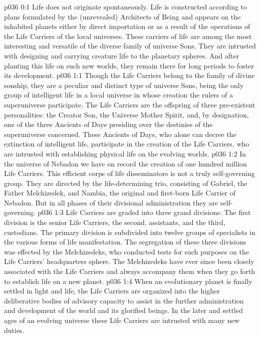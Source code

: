 \author{Vorondadek Son}
\vs p036 0:1 Life does not originate spontaneously. Life is constructed according to plans formulated by the (unrevealed) Architects of Being and appears on the inhabited planets either by direct importation or as a result of the operations of the Life Carriers of the local universes. These carriers of life are among the most interesting and versatile of the diverse family of universe Sons. They are intrusted with designing and carrying creature life to the planetary spheres. And after planting this life on such new worlds, they remain there for long periods to foster its development.\plusone
{}
\vs p036 1:1 Though the Life Carriers belong to the family of divine sonship, they are a peculiar and distinct type of universe Sons, being the only group of intelligent life in a local universe in whose creation the rulers of a superuniverse participate. The Life Carriers are the offspring of three pre\hyp{}existent personalities: the Creator Son, the Universe Mother Spirit, and, by designation, one of the three Ancients of Days presiding over the destinies of the superuniverse concerned. These Ancients of Days, who alone can decree the extinction of intelligent life, participate in the creation of the Life Carriers, who are intrusted with establishing physical life on the evolving worlds.
\vs p036 1:2 In the universe of Nebadon we have on record the creation of one hundred million Life Carriers. This efficient corps of life disseminators is not a truly self\hyp{}governing group. They are directed by the life\hyp{}determining trio, consisting of Gabriel, the Father Melchizedek, and Nambia, the original and first\hyp{}born Life Carrier of Nebadon. But in all phases of their divisional administration they are self\hyp{}governing.\plusone
\vs p036 1:3 Life Carriers are graded into three grand divisions: The first division is the senior Life Carriers, the second, assistants, and the third, custodians. The primary division is subdivided into twelve groups of specialists in the various forms of life manifestation. The segregation of these three divisions was effected by the Melchizedeks, who conducted tests for such purposes on the Life Carriers’ headquarters sphere. The Melchizedeks have ever since been closely associated with the Life Carriers and always accompany them when they go forth to establish life on a new planet.
\vs p036 1:4 When an evolutionary planet is finally settled in light and life, the Life Carriers are organized into the higher deliberative bodies of advisory capacity to assist in the further administration and development of the world and its glorified beings. In the later and settled ages of an evolving universe these Life Carriers are intrusted with many new duties.
